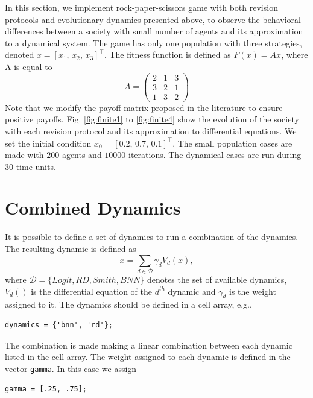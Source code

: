 \documentclass[a4paper,10pt]{article}
\def\th{^{th}}
\def\th{^{th}}
\begin{document}
In this section, we implement rock-paper-scissors game with both revision protocols and evolutionary dynamics presented above, to observe the behavioral differences between a society with small number of agents and its approximation to a dynamical system.
The game has only one population with three strategies, denoted $x = [x_1, \, x_2, \, x_3]^\top$. The fitness function is defined as $F(x)=Ax$, where A is equal to 
\begin{equation}
  A = \begin{pmatrix}
  2  & 1 &  3 \\
  3  & 2 &  1 \\
  1 &  3 &  2
  \end{pmatrix}
\end{equation}
Note that we modify the payoff matrix proposed in the literature to ensure positive payoffs.
Fig. \ref{fig:finite1} to \ref{fig:finite4} show the evolution of the society with each revision protocol and its approximation to differential equations. We set the initial condition $x_0 = [0.2, \, 0.7, \, 0.1 ]^\top$. The small population cases are made with $200$ agents and $10000$ iterations. The dynamical cases are run during 
30 time units.
















\section{Combined Dynamics}

It is possible to define a set of dynamics to run a combination of the dynamics. 
The resulting dynamic is defined as 
\begin{equation}
\dot{ x } = \sum_{d\in \mathcal{D}} \gamma_d V_d( x ),
\end{equation}
where $\mathcal{D}=\{ Logit, RD, Smith, BNN \}$ denotes the set of available dynamics, $V_d()$ is the differential equation of the $d\th$ dynamic and $\gamma_d$ is the weight assigned to it.
The dynamics should be defined in a cell array, e.g., 
\begin{lstlisting}
dynamics = {'bnn', 'rd'};
\end{lstlisting}
The combination is made making a linear combination between each dynamic listed in the cell array. The weight assigned to each dynamic is defined in the vector \verb|gamma|. In this case we assign 
\begin{lstlisting}
gamma = [.25, .75]; 
\end{lstlisting}
\end{document}
